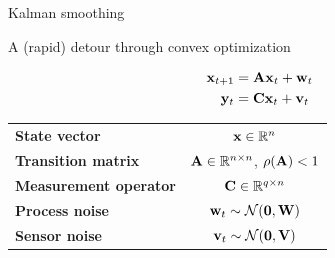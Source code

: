 \documentclass[aspectratio=169,compress,12pt,dvipsnames]{beamer}
\newcommand{\R}{\ensuremath{\mathbb{R}}}
\begin{document}
\begin{frame}
  \vfill
  { Kalman smoothing}

  { A (rapid) detour through convex optimization}
  \vfill
\end{frame}

\begin{frame}
  \vfill
  \begin{minipage}{.28\textwidth}
    \[
      \begin{aligned}
        \vb{x}_{t+1}  & = \vb{Ax}_t + \vb{w}_t \\
        \vb{y}_t      & = \vb{Cx}_t + \vb{v}_t
      \end{aligned}
    \]
  \end{minipage}%
  \hfill
  \begin{minipage}{.68\textwidth}
    \centering
    \begin{tabular}{lc}
      \textbf{State vector} & $\vb{x} \in \R^n$ \\
      \textbf{Transition matrix}  & $\vb{A} \in \R^{n \times n}$, $\rho(\vb{A}) < 1$  \\
      \textbf{Measurement operator} & $\vb{C} \in \R^{q \times n}$  \\
      \textbf{Process noise}  & $\vb{w}_t \sim \mathcal{N}(\vb{0}, \vb{W})$ \\
      \textbf{Sensor noise}   & $\vb{v}_t \sim \mathcal{N}(\vb{0}, \vb{V})$
    \end{tabular}
  \end{minipage}
  \vfill
\end{frame}
\end{document}
